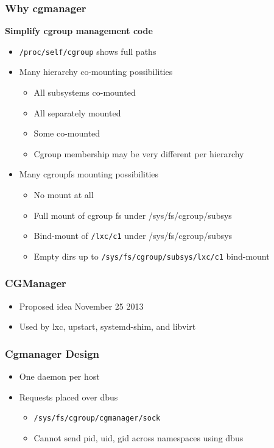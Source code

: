 \documentclass{beamer}
\begin{document}
\begin{frame}
\frametitle{Why cgmanager}
\textbf{Simplify cgroup management code}
\begin{itemize}
\item {\tt /proc/self/cgroup} shows full paths
\item Many hierarchy co-mounting possibilities
  \begin{itemize}
  \item All subsystems co-mounted
  \item All separately mounted
  \item Some co-mounted
  \item Cgroup membership may be very different per hierarchy
  \end{itemize}
\item Many cgroupfs mounting possibilities
  \begin{itemize}
  \item No mount at all
  \item Full mount of cgroup fs under /sys/fs/cgroup/subsys
  \item Bind-mount of {\tt /lxc/c1} under /sys/fs/cgroup/subsys
  \item Empty dirs up to {\tt /sys/fs/cgroup/subsys/lxc/c1} bind-mount
  \end{itemize}
\end{itemize}
\end{frame}

\begin{frame}
\frametitle{CGManager}
\begin{itemize}
\item Proposed idea November 25 2013
\item Used by lxc, upstart, systemd-shim, and libvirt
\end{itemize}
\end{frame}

\begin{frame}
\frametitle{Cgmanager Design}

\begin{itemize}
\item One daemon per host
\item Requests placed over dbus
\begin{itemize}
\item {\tt /sys/fs/cgroup/cgmanager/sock}
\item Cannot send pid, uid, gid across namespaces using dbus
\end{itemize}
\end{itemize}
\end{frame}
\end{document}
